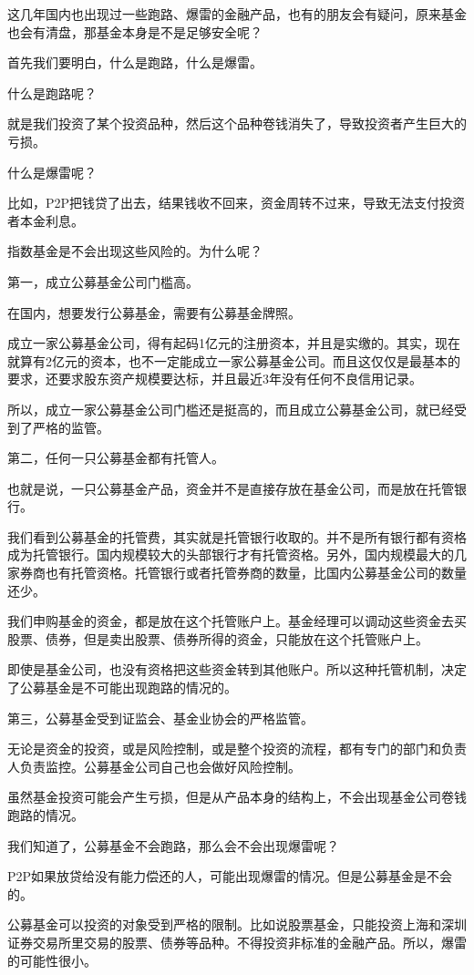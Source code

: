 这几年国内也出现过一些跑路、爆雷的金融产品，也有的朋友会有疑问，原来基金也会有清盘，那基金本身是不是足够安全呢？

首先我们要明白，什么是跑路，什么是爆雷。

什么是跑路呢？

就是我们投资了某个投资品种，然后这个品种卷钱消失了，导致投资者产生巨大的亏损。

什么是爆雷呢？

比如，P2P把钱贷了出去，结果钱收不回来，资金周转不过来，导致无法支付投资者本金利息。

指数基金是不会出现这些风险的。为什么呢？

第一，成立公募基金公司门槛高。

在国内，想要发行公募基金，需要有公募基金牌照。

成立一家公募基金公司，得有起码1亿元的注册资本，并且是实缴的。其实，现在就算有2亿元的资本，也不一定能成立一家公募基金公司。而且这仅仅是最基本的要求，还要求股东资产规模要达标，并且最近3年没有任何不良信用记录。

所以，成立一家公募基金公司门槛还是挺高的，而且成立公募基金公司，就已经受到了严格的监管。

第二，任何一只公募基金都有托管人。

也就是说，一只公募基金产品，资金并不是直接存放在基金公司，而是放在托管银行。

我们看到公募基金的托管费，其实就是托管银行收取的。并不是所有银行都有资格成为托管银行。国内规模较大的头部银行才有托管资格。另外，国内规模最大的几家券商也有托管资格。托管银行或者托管券商的数量，比国内公募基金公司的数量还少。

我们申购基金的资金，都是放在这个托管账户上。基金经理可以调动这些资金去买股票、债券，但是卖出股票、债券所得的资金，只能放在这个托管账户上。

即使是基金公司，也没有资格把这些资金转到其他账户。所以这种托管机制，决定了公募基金是不可能出现跑路的情况的。

第三，公募基金受到证监会、基金业协会的严格监管。

无论是资金的投资，或是风险控制，或是整个投资的流程，都有专门的部门和负责人负责监控。公募基金公司自己也会做好风险控制。

虽然基金投资可能会产生亏损，但是从产品本身的结构上，不会出现基金公司卷钱跑路的情况。

我们知道了，公募基金不会跑路，那么会不会出现爆雷呢？

P2P如果放贷给没有能力偿还的人，可能出现爆雷的情况。但是公募基金是不会的。

公募基金可以投资的对象受到严格的限制。比如说股票基金，只能投资上海和深圳证券交易所里交易的股票、债券等品种。不得投资非标准的金融产品。所以，爆雷的可能性很小。

